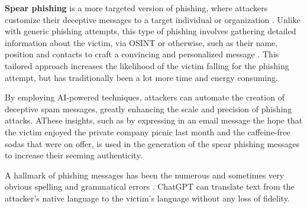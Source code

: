 \textbf{Spear phishing} is a more targeted version of phishing, where attackers customize their deceptive messages to a target individual or organization \citep{basitComprehensiveSurveyAIenabledPhishingAttacks2021}. Unlike with generic phishing attempts, this type of phishing involves gathering detailed information about the victim, via OSINT or otherwise, such as their name, position and contacts to craft a convincing and personalized message \citep{salahdineSocialEngineeringAttacks2019}. This tailored approach increases the likelihood of the victim falling for the phishing attempt, but has traditionally been a lot more time and energy consuming.

By employing AI-powered techniques, attackers can automate the creation of deceptive spam messages, greatly enhancing the scale and precision of phishing attacks. AThese insights, such as by expressing in an email message the hope that the victim enjoyed the private company picnic last month and the caffeine-free sodas that were on offer, is used in the generation of the spear phishing messages to increase their seeming authenticity.

A hallmark of phishing messages has been the numerous and sometimes very obvious spelling and grammatical errors \citep{basitComprehensiveSurveyAIenabledPhishingAttacks2021}. ChatGPT can translate text from the attacker's native language to the victim's language without any loss of fidelity.